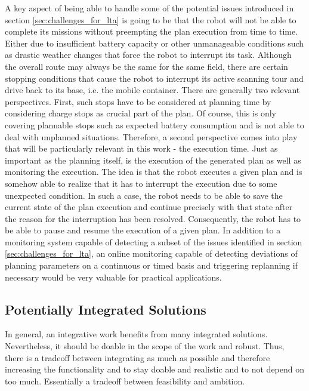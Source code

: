 \documentclass[english, master, expose, utf8]{base/thesis_KBS}
\begin{document}
A key aspect of being able to handle some of the potential issues introduced in section \ref{sec:challenges_for_lta} is going to be that the robot will not be able to
complete its missions without preempting the plan execution from time to time. Either due to insufficient battery capacity or other unmanageable conditions such as 
drastic weather changes that force the robot to interrupt its task. Although the overall route may always be the same for the same field, there are certain stopping
conditions that cause the robot to interrupt its active scanning tour and drive back to its base, i.e. the mobile container.
There are generally two relevant perspectives. First, such stops have to be considered at planning time by considering charge stops as crucial part of the plan.
Of course, this is only covering plannable stops such as expected battery consumption and is not able to deal with unplanned situations.
Therefore, a second perspective comes into play that will be particularly relevant in this work - the execution time.
Just as important as the planning itself, is the execution of the generated plan as well as monitoring the execution.
The idea is that the robot executes a given plan and is somehow able to realize that it has to interrupt the execution due to some unexpected condition.
In such a case, the robot needs to be able to save the current state of the plan execution and continue precisely with that state after the reason 
for the interruption has been resolved. Consequently, the robot has to be able to pause and resume the execution of a given plan.\newline
In addition to a monitoring system capable of detecting a subset of the issues identified in section \ref{sec:challenges_for_lta},
an online monitoring capable of detecting deviations of planning parameters on a continuous or timed basis and triggering replanning if necessary would
be very valuable for practical applications.

\subsection{Potentially Integrated Solutions}

In general, an integrative work benefits from many integrated solutions. Nevertheless, it should be doable in the scope of the work and robust.
Thus, there is a tradeoff between integrating as much as possible and therefore increasing the functionality and to stay doable and realistic and 
to not depend on too much. Essentially a tradeoff between feasibility and ambition.
\end{document}
